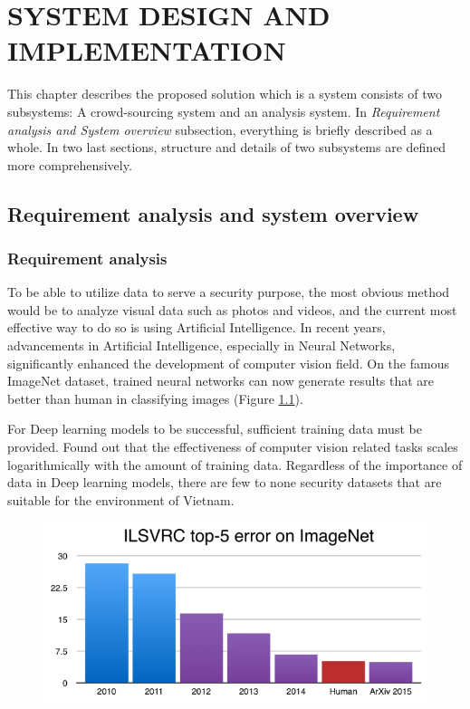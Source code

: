 \chapter{SYSTEM DESIGN AND IMPLEMENTATION}
\label{chap:caseFarming}

This chapter describes the proposed solution which is a system consists of two subsystems: A crowd-sourcing system and an analysis system. In \textit{Requirement analysis and System overview} subsection, everything is briefly described as a whole. In two last sections, structure and details of two subsystems are defined more comprehensively.

\section{Requirement analysis and system overview}
\subsection{Requirement analysis}

To be able to utilize data to serve a security purpose, the most obvious method would be to analyze visual data such as photos and videos, and the current most effective way to do so is using Artificial Intelligence. In recent years, advancements in Artificial Intelligence, especially in Neural Networks, significantly enhanced the development of computer vision field. On the famous ImageNet  dataset, trained neural networks can now generate results that are better than human in classifying images (Figure \ref{chap3:deeplearning_vs_human}). 

For Deep learning models to be successful, sufficient training data must be provided. \cite{DBLP:journals/corr/SunSSG17} Found out that the effectiveness of computer vision related tasks scales logarithmically with the amount of training data. Regardless of the importance of data in Deep learning models, there are few to none security datasets that are suitable for the environment of Vietnam.     

\begin{center}
    \begin{figure}[H]
    \centering
    \includegraphics[width=0.75\columnwidth]{images/chap3/deeplearning_vs_human.png}
    \label{chap3:deeplearning_vs_human}
    \end{figure}
\end{center}

